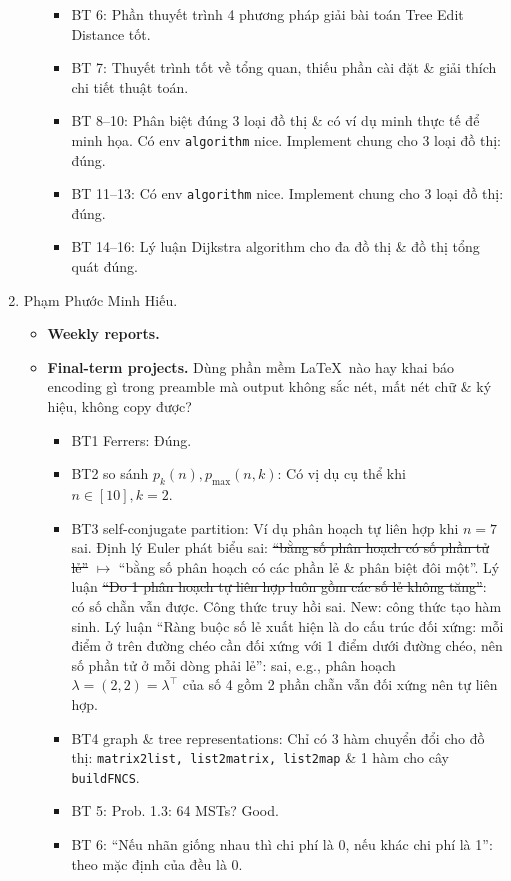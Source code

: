 \documentclass{article}
\begin{document}
\begin{enumerate}
\begin{itemize}
\begin{itemize}
            \item BT 6: Phần thuyết trình 4 phương pháp giải bài toán Tree Edit Distance tốt.
            \item BT 7: Thuyết trình tốt về tổng quan, thiếu phần cài đặt \& giải thích chi tiết thuật toán.
            \item BT 8--10: Phân biệt đúng 3 loại đồ thị \& có ví dụ minh thực tế để minh họa. Có env {\tt algorithm} nice. Implement chung cho 3 loại đồ thị: đúng.
            \item BT 11--13: Có env {\tt algorithm} nice. Implement chung cho 3 loại đồ thị: đúng.
            \item BT 14--16: Lý luận Dijkstra algorithm cho đa đồ thị \& đồ thị tổng quát đúng.
        \end{itemize}
    \end{itemize}
    \item {\sc Phạm Phước Minh Hiếu.}
    \begin{itemize}
        \item {\bf Weekly reports.}
        \item {\bf Final-term projects.} Dùng phần mềm \LaTeX\ nào hay khai báo encoding gì trong preamble mà output không sắc nét, mất nét chữ \& ký hiệu, không copy được?
        \begin{itemize}
            \item BT1 Ferrers: Đúng.
            \item BT2 so sánh $p_k(n),p_{\max}(n,k)$: Có vị dụ cụ thể khi $n\in[10],k = 2$.
            \item BT3 self-conjugate partition: Ví dụ phân hoạch tự liên hợp khi $n = 7$ sai. Định lý Euler phát biểu sai: \st{``bằng số phân hoạch có số phần tử lẻ''} $\mapsto$ ``bằng số phân hoạch có các phần lẻ \& phân biệt đôi một''. Lý luận \st{``Do 1 phân hoạch tự liên hợp luôn gồm các số lẻ không tăng''}: có số chẵn vẫn được. Công thức truy hồi sai. New: công thức tạo hàm sinh. Lý luận ``Ràng buộc số lẻ xuất hiện là do cấu trúc đối xứng: mỗi điểm ở trên đường chéo cần đối xứng với 1 điểm dưới đường chéo, nên số phần tử ở mỗi dòng phải lẻ'': sai, e.g., phân hoạch $\lambda = (2,2) = \lambda^\top$ của số 4 gồm 2 phần chẵn vẫn đối xứng nên tự liên hợp.
            \item BT4 graph \& tree representations: Chỉ có 3 hàm chuyển đổi cho đồ thị: {\tt matrix2list, list2matrix, list2map} \& 1 hàm cho cây {\tt buildFNCS}.
            \item BT 5: Prob. 1.3: 64 MSTs? Good.
            \item BT 6: ``Nếu nhãn giống nhau thì chi phí là 0, nếu khác chi phí là 1'': theo mặc định của \cite{Valiente2021} đều là 0.

\end{itemize}
\end{itemize}
\end{enumerate}
\end{document}

